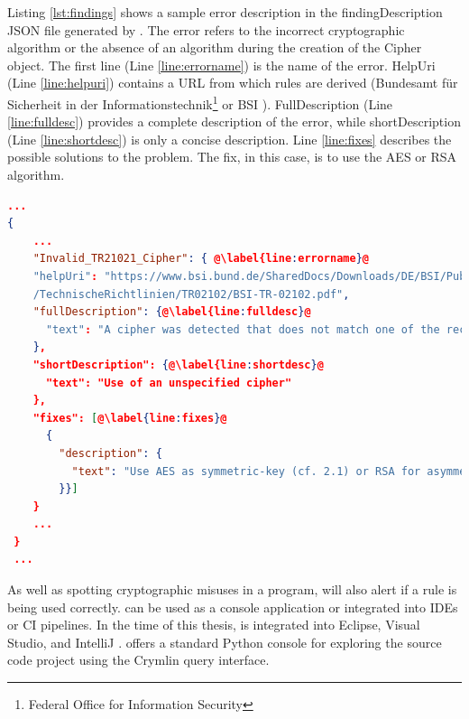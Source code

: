 Listing \ref{lst:findings} shows a sample error description in the findingDescription JSON file generated by \codyze{}. The error refers to the incorrect cryptographic algorithm or the absence of an algorithm during the creation of the Cipher object. The first line (Line \ref{line:errorname}) is the name of the error. HelpUri (Line \ref{line:helpuri}) contains a URL from which \MARK{} rules are derived (Bundesamt für Sicherheit in der Informationstechnik\footnote{Federal Office for Information Security} or BSI \cite{BSI}). FullDescription (Line \ref{line:fulldesc}) provides a complete description of the error, while shortDescription (Line \ref{line:shortdesc}) is only a concise description. Line \ref{line:fixes} describes the possible solutions to the problem. The fix, in this case, is to use the AES or RSA algorithm.
\pagebreak
\begin{lstlisting}[language=json, caption= {Part of findingDescription.json file generated by \codyze{} after analyzing Listing \ref{lst:codesample}}, label={lst:findings}, escapechar=@]
...
{
    ...
    "Invalid_TR21021_Cipher": { @\label{line:errorname}@
    "helpUri": "https://www.bsi.bund.de/SharedDocs/Downloads/DE/BSI/Publikationen@\label{line:helpuri}@
    /TechnischeRichtlinien/TR02102/BSI-TR-02102.pdf",
    "fullDescription": {@\label{line:fulldesc}@
      "text": "A cipher was detected that does not match one of the recommended ciphers by BSI TR-02102. Use of weak or unspecified ciphers may not guarantee sufficient security."
    },
    "shortDescription": {@\label{line:shortdesc}@
      "text": "Use of an unspecified cipher"
    },
    "fixes": [@\label{line:fixes}@
      {
        "description": {
          "text": "Use AES as symmetric-key (cf. 2.1) or RSA for asymmetric-key algorithm (cf. 3)"
        }}]
    }
    ...
 }
 ...
\end{lstlisting}


As well as spotting cryptographic misuses in a program, \codyze{} will also alert if a \MARK{} rule is being used correctly. \codyze{} can be used as a console application or integrated into IDEs or CI pipelines. In the time of this thesis, \codyze{} is integrated into Eclipse, Visual Studio, and IntelliJ \cite{cod}. \codyze{} offers a standard Python console for exploring the source code project using the Crymlin query interface.

